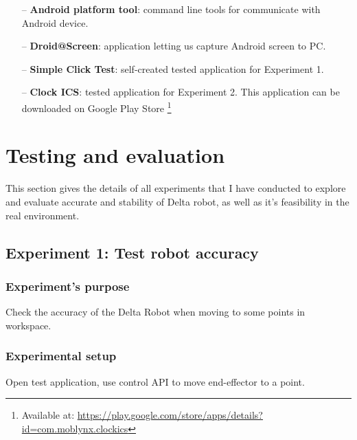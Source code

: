 	\begin{itemize}
		\item[--] \textbf{Android platform tool}: command line tools for communicate with Android device.
		\item[--] \textbf{Droid@Screen}: application letting us capture Android screen to PC.
		\item[--] \textbf{Simple Click Test}: self-created tested application for Experiment 1.
		\item[--] \textbf{Clock ICS}: tested application for Experiment 2. This application can be downloaded on Google Play Store \footnote{Available at: \url{https://play.google.com/store/apps/details?id=com.moblynx.clockics}}
	\end{itemize}

\section{Testing and evaluation}

This section gives the details of all experiments that I have conducted to explore and evaluate accurate and stability of Delta robot, as well as it's feasibility in the real environment.

\subsection{Experiment 1: Test robot accuracy}
\subsubsection{Experiment's purpose}
Check the accuracy of the Delta Robot when moving to some points in workspace.
\subsubsection{Experimental setup}
Open test application, use control API to move end-effector to a point.
